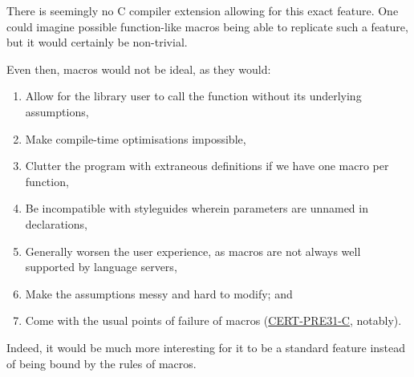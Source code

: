 \documentclass[a4paper, 12pt]{article}
\begin{document}
There is seemingly no C compiler extension allowing for this exact feature.  One
could imagine possible function-like macros being able to replicate such a
feature, but it would certainly be non-trivial.

Even then, macros would not be ideal, as they would:
\begin{enumerate}
\item Allow for the library user to call the function without its underlying assumptions,
\item Make compile-time optimisations impossible,
\item Clutter the program with extraneous definitions if we have one macro per function,
\item Be incompatible with styleguides wherein parameters are unnamed in declarations,
\item Generally worsen the user experience, as macros are not always well supported
by language servers,
\item Make the assumptions messy and hard to modify; and
\item Come with the usual points of failure of macros (\href{https://wiki.sei.cmu.edu/confluence/display/c/PRE31-C.+Avoid+side+effects+in+arguments+to+unsafe+macros}{CERT-PRE31-C}, notably).
\end{enumerate}

Indeed, it would be much more interesting for it to be a standard feature
instead of being bound by the rules of macros.
\end{document}
